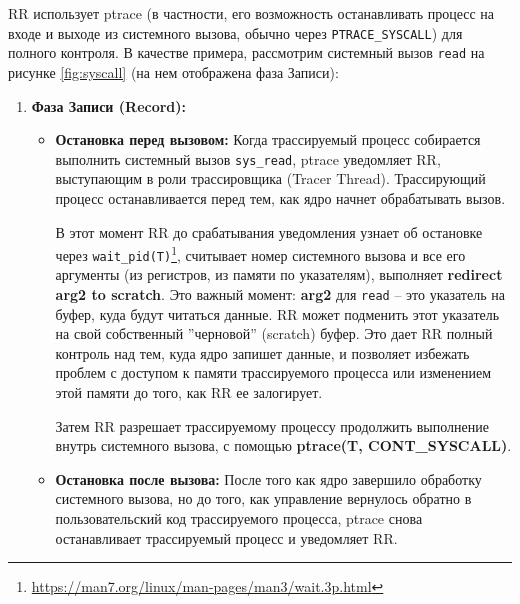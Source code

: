 RR использует ptrace (в частности, его возможность останавливать процесс на
входе и выходе из системного вызова, обычно через \texttt{PTRACE\_SYSCALL}) для
полного контроля. В качестве примера, рассмотрим системный вызов \texttt{read}
на рисунке \ref{fig:syscall} (на нем отображена фаза Записи):

\begin{enumerate}

  \item \textbf{Фаза Записи (Record):}

    \begin{itemize}

      \item \textbf{Остановка перед вызовом:} Когда трассируемый процесс
      собирается выполнить системный вызов \texttt{sys\_read}, ptrace
      уведомляет RR, выступающим в роли трассировщика (Tracer Thread).
      Трассирующий процесс останавливается перед тем, как ядро начнет
      обрабатывать вызов.

      В этот момент RR до срабатывания уведомления узнает об остановке через
      \texttt{wait\_pid(T)}\footnote{\url{https://man7.org/linux/man-pages/man3/wait.3p.html}},
      считывает номер системного вызова и все его аргументы (из регистров, из
      памяти по указателям), выполняет \textbf{redirect arg2 to scratch}. Это
      важный момент: \textbf{arg2} для \texttt{read} – это указатель на буфер, куда
      будут читаться данные. RR может подменить этот указатель на свой
      собственный ''черновой'' (scratch) буфер. Это дает RR полный контроль над
      тем, куда ядро запишет данные, и позволяет избежать проблем с доступом к
      памяти трассируемого процесса или изменением этой памяти до того, как RR
      ее залогирует.

      Затем RR разрешает трассируемому процессу продолжить выполнение внутрь
      системного вызова, с помощью \textbf{ptrace(T, CONT\_SYSCALL)}.

      \item{\textbf{Остановка после вызова:}} После того как ядро завершило
      обработку системного вызова, но до того, как управление вернулось обратно
      в пользовательский код трассируемого процесса, ptrace снова останавливает
      трассируемый процесс и уведомляет RR.



\end{itemize}
\end{enumerate}
